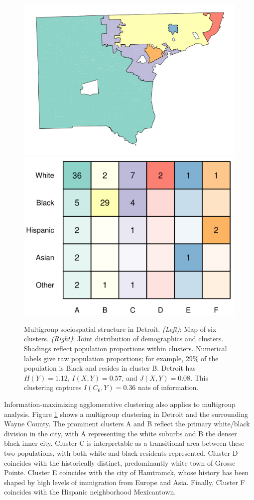 \documentclass[9pt,twocolumn,twoside]{pnas-new}
\begin{document}
	
	\begin{figure}
		\centering
			\includegraphics[width = .5\linewidth]{figs/example_cluster_map.pdf}
			\includegraphics[width = .45\linewidth]{figs/example_clusters_detailed.pdf}
			\caption{
				Multigroup sociospatial structure in Detroit. 
				\emph{(Left)}: Map of six clusters. 
				\emph{(Right)}: Joint distribution of demographics and clusters. 
				Shadings reflect population proportions within clusters. 
				Numerical labels give raw population proportions; for example, 29\% of the population is Black and resides in cluster B. 
				Detroit has $H(Y) = 1.12$, $I(X,Y) = 0.57$, and $J(X,Y) = 0.08$. 
				This clustering captures $I(C_6,Y) = 0.36$ nats of information.
			} \label{fig:detroit}
	\end{figure}

	Information-maximizing agglomerative clustering also applies to multigroup analysis.  Figure \ref{fig:detroit} shows a multigroup clustering in Detroit and the surrounding Wayne County. The prominent clusters A and B reflect the primary white/black division in the city, with A representing the white suburbs and B the denser black inner city. Cluster C is interpretable as a transitional area between these two populations, with both white and black residents represented. Cluster D coincides with the historically distinct, predominantly white town of Grosse Pointe. Cluster E coincides with the city of Hamtramck, whose history has been shaped by high levels of immigration from Europe and Asia. Finally, Cluster F coincides with the Hispanic neighborhood Mexicantown. 
\end{document}
